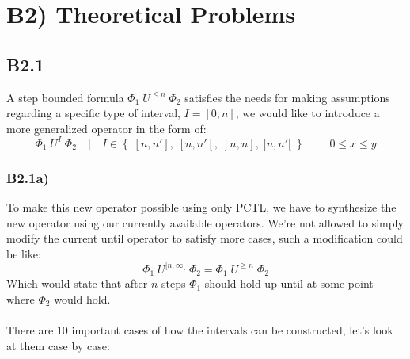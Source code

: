 \documentclass[12pt]{report}
\begin{document}
\section*{B2) Theoretical Problems}
\subsection*{B2.1}
A step bounded formula $\Phi_1\;U^{\leqslant n}\;\Phi_2$ satisfies the needs for making assumptions regarding a specific type of interval, $I = [0, n]$, we would like to introduce a more generalized operator in the form of:
$$\Phi_1\;U^{I}\;\Phi_2 \quad | \quad I \in \left\{\;[n,n'],\;[n, n'[,\;]n, n],\;]n, n'[\;\right\} \quad | \quad 0 \leq x \leq y$$

\subsubsection*{B2.1a)}
To make this new operator possible using only PCTL, we have to synthesize the new operator using our currently available operators. We're not allowed to simply modify the current until operator to satisfy more cases, such a modification could be like:
$$\Phi_1\;U^{[n, \infty[}\;\Phi_2 = \Phi_1\;U^{\geqslant n}\;\Phi_2$$
Which would state that after $n$ steps $\Phi_1$ should hold up until at some point where $\Phi_2$ would hold.\\
\\
There are 10 important cases of how the intervals can be constructed, let's look at them case by case:
\end{document}
